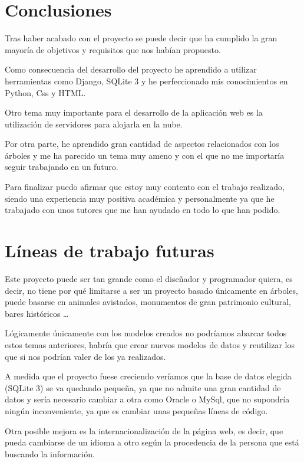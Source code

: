 
\section{Conclusiones} 

Tras haber acabado con el proyecto se puede decir que ha cumplido la gran mayoría de objetivos y requisitos que nos habían propuesto.

Como consecuencia del desarrollo del proyecto he aprendido a utilizar herramientas como Django, SQLite 3 y he perfeccionado mis conocimientos en Python, Css y HTML.

Otro tema muy importante para el desarrollo de la aplicación web es la utilización de servidores para alojarla en la nube.

Por otra parte, he aprendido gran cantidad de aspectos relacionados con los árboles y me ha parecido un tema muy ameno y con el que no me importaría seguir trabajando en un futuro.

Para finalizar puedo afirmar que estoy muy contento con el trabajo realizado, siendo una experiencia muy positiva académica y personalmente ya que he trabajado con unos tutores que me han ayudado en todo lo que han podido.

\section{Líneas de trabajo futuras} \label{trabajosFuturos}

Este proyecto puede ser tan grande como el diseñador y programador quiera, es decir, no tiene por qué limitarse a ser un proyecto basado únicamente en árboles, puede basarse en animales avistados, monumentos de gran patrimonio cultural, bares históricos \ldots 

Lógicamente únicamente con los modelos creados no podríamos abarcar todos estos temas anteriores, habría que crear nuevos modelos de datos y reutilizar los que si nos podrían valer de los ya realizados.

A medida que el proyecto fuese creciendo veríamos que la base de datos elegida (SQLite 3) se va quedando pequeña, ya que no admite una gran cantidad de datos y sería necesario cambiar a otra como Oracle o MySql, que no supondría ningún inconveniente, ya que es cambiar unas pequeñas líneas de código.  

Otra posible mejora es la internacionalización de la página web, es decir, que pueda cambiarse de un idioma a otro según la procedencia de la persona que está buscando la información.

 
